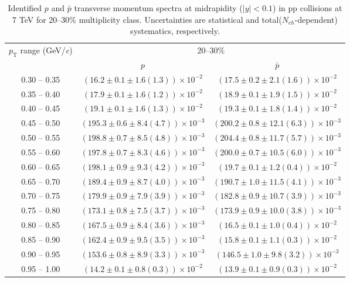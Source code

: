 \begin{table}
\caption{Identified $p$ and $\bar{p}$  transverse momentum spectra at midrapidity ($|y|<0.1$) in pp collisions at 7 TeV for 20--30\% multiplicity class. Uncertainties are statistical and total($N_{ch}$-dependent) systematics, respectively.}
\label{tab:ProtonPlus_ProtonMinus_20to30}
\begin{center}
\begin{tabular}{ c | c c }
\hline
\multirow{2}{*}{$p_{\mathrm{T}}$ range (GeV/\textit{c})} & \multicolumn{2}{c}{20--30\%} \\ & $p$& $\bar{p}$\\ 
\hline
0.30 -- 0.35 & $(16.2\pm0.1\pm1.6(1.3))\times10^{-2}$ & $(17.5\pm0.2\pm2.1(1.6))\times10^{-2}$ \\ 
0.35 -- 0.40 & $(17.9\pm0.1\pm1.6(1.2))\times10^{-2}$ & $(18.9\pm0.1\pm1.9(1.5))\times10^{-2}$ \\ 
0.40 -- 0.45 & $(19.1\pm0.1\pm1.6(1.3))\times10^{-2}$ & $(19.3\pm0.1\pm1.8(1.4))\times10^{-2}$ \\ 
0.45 -- 0.50 & $(195.3\pm0.6\pm8.4(4.7))\times10^{-3}$ & $(200.2\pm0.8\pm12.1(6.3))\times10^{-3}$ \\ 
0.50 -- 0.55 & $(198.8\pm0.7\pm8.5(4.8))\times10^{-3}$ & $(204.4\pm0.8\pm11.7(5.7))\times10^{-3}$ \\ 
0.55 -- 0.60 & $(197.8\pm0.7\pm8.3(4.6))\times10^{-3}$ & $(200.0\pm0.7\pm10.5(6.0))\times10^{-3}$ \\ 
0.60 -- 0.65 & $(198.1\pm0.9\pm9.3(4.2))\times10^{-3}$ & $(19.7\pm0.1\pm1.2(0.4))\times10^{-2}$ \\ 
0.65 -- 0.70 & $(189.4\pm0.9\pm8.7(4.0))\times10^{-3}$ & $(190.7\pm1.0\pm11.5(4.1))\times10^{-3}$ \\ 
0.70 -- 0.75 & $(179.9\pm0.9\pm7.9(3.9))\times10^{-3}$ & $(182.8\pm0.9\pm10.7(3.9))\times10^{-3}$ \\ 
0.75 -- 0.80 & $(173.1\pm0.8\pm7.5(3.7))\times10^{-3}$ & $(173.9\pm0.9\pm10.0(3.8))\times10^{-3}$ \\ 
0.80 -- 0.85 & $(167.5\pm0.9\pm8.4(3.6))\times10^{-3}$ & $(16.5\pm0.1\pm1.0(0.4))\times10^{-2}$ \\ 
0.85 -- 0.90 & $(162.4\pm0.9\pm9.5(3.5))\times10^{-3}$ & $(15.8\pm0.1\pm1.1(0.3))\times10^{-2}$ \\ 
0.90 -- 0.95 & $(153.6\pm0.8\pm8.9(3.3))\times10^{-3}$ & $(146.5\pm1.0\pm9.8(3.2))\times10^{-3}$ \\ 
0.95 -- 1.00 & $(14.2\pm0.1\pm0.8(0.3))\times10^{-2}$ & $(13.9\pm0.1\pm0.9(0.3))\times10^{-2}$ \\ 

\end{tabular}
\end{center}
\end{table}
